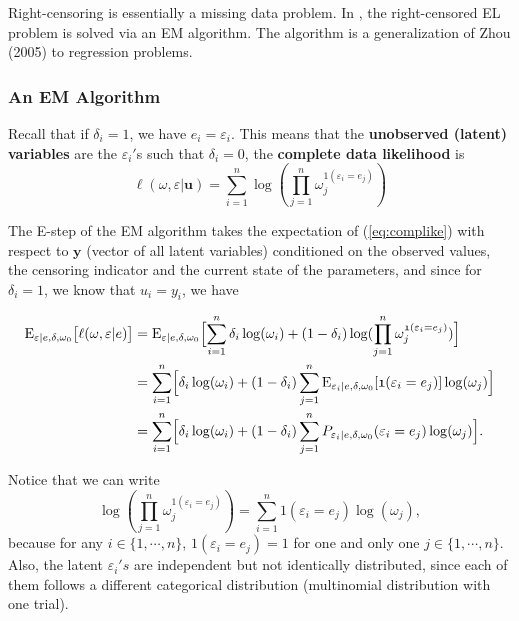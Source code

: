 \documentclass[article]{jss}
\renewcommand{\|}{\,|\,}
\begin{document}
Right-censoring is essentially a missing data problem. In , the right-censored EL problem is solved via an EM algorithm. The algorithm is a generalization of Zhou (2005) to regression problems.

\hypertarget{an-em-algorithm}{%
\subsubsection{An EM Algorithm}\label{an-em-algorithm}}

Recall that if \(\delta_i=1\), we have \(e_i=\varepsilon_i\). This means that the \textbf{unobserved (latent) variables} are the \(\varepsilon_i'\)s such that \(\delta_i = 0\), the \textbf{complete data likelihood} is
\begin{equation}\label{eq:complike}
  \ell(\omega,\varepsilon|\bm u) = \sum_{i=1}^n\log(\prod_{j=1}^n \omega_j^{\mathfrak 1(\varepsilon_i=e_j)})
\end{equation}

The E-step of the EM algorithm takes the expectation of (\ref{eq:complike}) with respect to \(\bm y\) (vector of all latent variables) conditioned on the observed values, the censoring indicator and the current state of the parameters, and since for \(\delta_i = 1\), we know that \(u_i=y_i\), we have

\begin{equation}\label{eq:estep}
\begin{split}
  \textrm{E}_{\varepsilon|e,\delta,\omega_0}\bigl[\ell(\omega,\varepsilon|e)\bigr]
  &= \textrm{E}_{\varepsilon|e,\delta,\omega_0}\Bigl[\sum_{i=1}^n\delta_i\log(\omega_i) +
  (1-\delta_i)\log(\prod_{j=1}^n \omega_j^{\mathfrak 1(\varepsilon_i=e_j)})\Bigr] \\
  &= \sum_{i=1}^n\Bigl[\delta_i\log(\omega_i) +
  (1-\delta_i)\sum_{j=1}^n \textrm{E}_{\varepsilon_i|e,\delta,\omega_0}[\mathfrak1(\varepsilon_i=e_j)]\log(\omega_j)\Bigr] \\
  &= \sum_{i=1}^n\Bigl[\delta_i\log(\omega_i) +
  (1-\delta_i)\sum_{j=1}^n P_{\varepsilon_i|e,\delta,\omega_0}(\varepsilon_i=e_j)\log(\omega_j)\Bigr].
\end{split}
\end{equation}

Notice that we can write
\[
  \log(\prod_{j=1}^n \omega_j^{\mathfrak 1(\varepsilon_i=e_j)}) =
  \sum_{i=1}^n \mathfrak 1(\varepsilon_i=e_j)\log(\omega_j),
\]
because for any \(i \in \{1,\cdots,n\}\), \(\mathfrak 1(\varepsilon_i=e_j)=1\) for one and only one \(j\in\{1,\cdots,n\}\). Also, the latent \(\varepsilon_i's\) are independent but not identically distributed, since each of them follows a different categorical distribution (multinomial distribution with one trial).
\end{document}
